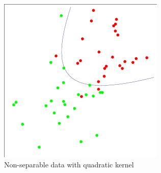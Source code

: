 \documentclass[10pt]{article}
\begin{document}
\begin{figure}[htb]
				\begin{center}
				\includegraphics[width=300px]{Project/svm_plot_ker.pdf}
				\caption{Non-separable data with quadratic kernel}
					\label{fig:svm_plot_ker}
				\end{center}
				\end{figure}


\nocite{burges,platt1998sequential,ng,ng_smo}


\end{document}
